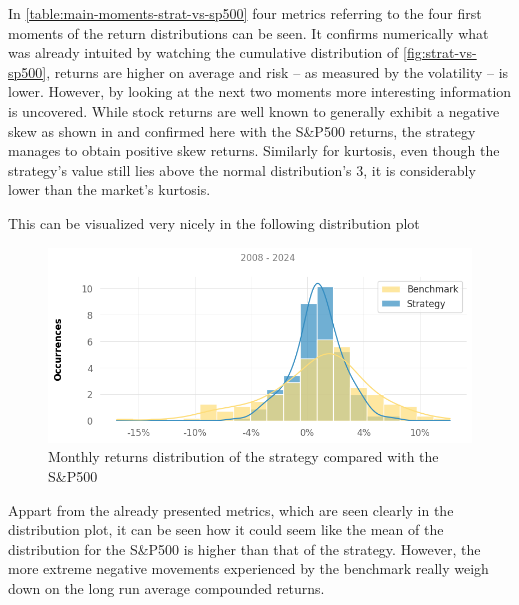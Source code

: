 In \autoref{table:main-moments-strat-vs-sp500} four metrics referring to the four first moments of the return distributions can be seen. 
It confirms numerically what was already intuited by watching the cumulative distribution of \autoref{fig:strat-vs-sp500}, returns are higher on average and risk -- as measured by the volatility -- is lower. However, by looking at the next two moments more interesting information is uncovered. While stock returns are well known to generally exhibit a negative skew as shown in \cite{peiro_1999} and confirmed here with the S\&P500 returns, the strategy manages to obtain positive skew returns. Similarly for kurtosis, even though the strategy's value still lies above the normal distribution's 3, it is considerably lower than the market's kurtosis.

This can be visualized very nicely in the following distribution plot

\begin{figure}[ht]
    \includegraphics[width=\linewidth]{assets/strat-vs-sp500-ret-dist.png}
    \caption{Monthly returns distribution of the strategy compared with the S\&P500}
    \label{fig:strat-vs-sp500-ret-dist}
\end{figure}

Appart from the already presented metrics, which are seen clearly in the distribution plot, it can be seen how it could seem like the mean of the distribution for the S\&P500 is higher than that of the strategy. However, the more extreme negative movements experienced by the benchmark really weigh down on the long run average compounded returns. 

